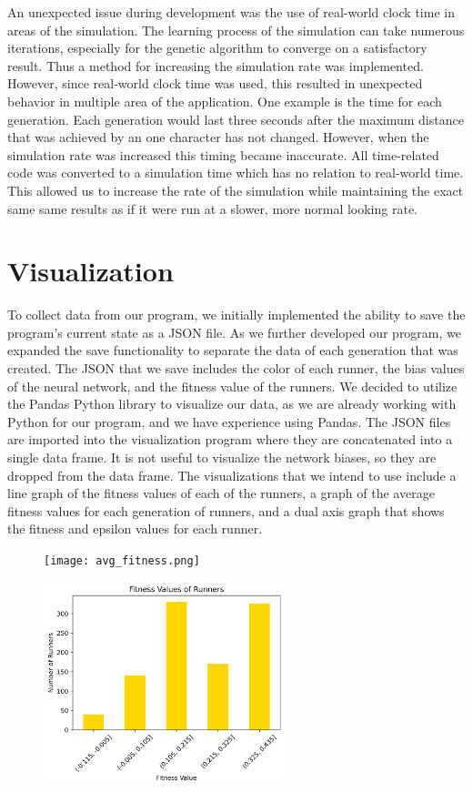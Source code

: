 \documentclass[letterpaper]{article} %
\begin{document}
\par An unexpected issue during development was the use of real-world clock time in areas of the simulation. The learning process of the simulation can take numerous iterations, especially for the genetic algorithm to converge on a satisfactory result. Thus a method for increasing the simulation rate was implemented. However, since real-world clock time was used, this resulted in unexpected behavior in multiple area of the application. One example is the time for each generation. Each generation would last three seconds after the maximum distance that was achieved by an one character has not changed. However, when the simulation rate was increased this timing became inaccurate. All time-related code was converted to a simulation time which has no relation to real-world time. This allowed us to increase the rate of the simulation while maintaining the exact same same results as if it were run at a slower, more normal looking rate.

\section{Visualization}

\par To collect data from our program, we initially implemented the ability to save the program's current state as a JSON file. As we further developed our program, we expanded the save functionality to separate the data of each generation that was created. The JSON that we save includes the color of each runner, the bias values of the neural network, and the fitness value of the runners. We decided to utilize the Pandas Python library to visualize our data, as we are already working with Python for our program, and we have experience using Pandas. The JSON files are imported into the visualization program where they are concatenated into a single data frame. It is not useful to visualize the network biases, so they are dropped from the data frame. The visualizations that we intend to use include a line graph of the fitness values of each of the runners, a graph of the average fitness values for each generation of runners, and a dual axis graph that shows the fitness and epsilon values for each runner.

\begin{figure}[h]
\centering
\texttt{[image: avg\_fitness.png]}
\end{figure}

\begin{figure}[h]
\centering
\includegraphics[width=7cm]{fitness_dist.png}
\end{figure}
\end{document}
